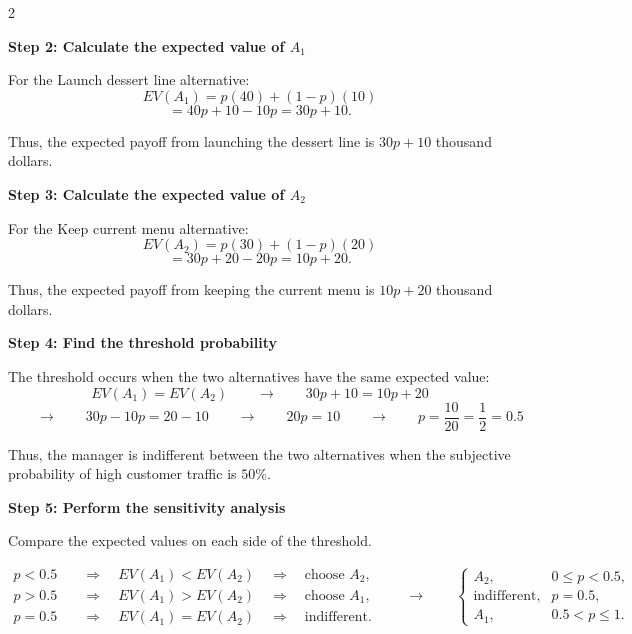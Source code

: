 	\vspace{-3mm}
	
	\noindent
	\setlength{\columnseprule}{0.4pt} 
	\begin{multicols}{2}
		\vspace{0pt}
		
		\textbf{Step 2: Calculate the expected value of $A_1$}
		
		For the Launch dessert line alternative:
		\[
		EV(A_1)
		=
		p(40)
		+
		(1-p)(10)
		\]
		\[
		=
		40p+10-10p
		=
		30p+10.
		\]
		
		Thus, the expected payoff from launching the dessert line is
		$30p+10$ thousand dollars.
		
		\columnbreak
		
		\textbf{Step 3: Calculate the expected value of $A_2$}
		
		For the Keep current menu alternative:
		\[
		EV(A_2)
		=
		p(30)
		+
		(1-p)(20)
		\]
		\[
		=
		30p+20-20p
		=
		10p+20.
		\]
		
		Thus, the expected payoff from keeping the current menu is
		$10p+20$ thousand dollars.
		
	\end{multicols}
	
	
	\setlength{\columnseprule}{0pt}
	
	\textbf{Step 4: Find the threshold probability}
	
	The threshold occurs when the two alternatives have the same expected
	value:
	\[
	EV(A_1)=EV(A_2)
	\qquad \longrightarrow \qquad
	30p+10=10p+20
	\]
	\[
	\qquad \longrightarrow \qquad
	30p-10p=20-10
	\qquad \longrightarrow \qquad
	20p=10
	\qquad \longrightarrow \qquad
	p=\frac{10}{20}
	=\frac{1}{2}
	=0.5
	\]
	
	Thus, the manager is indifferent between the two alternatives when the
	subjective probability of high customer traffic is $50\%$.
	
	\textbf{Step 5: Perform the sensitivity analysis}
	
	Compare the expected values on each side of the threshold.
	
	\[
	\begin{aligned}
		p<0.5 &\quad\Rightarrow\quad EV(A_1)<EV(A_2) \quad\Rightarrow\quad \text{choose } A_2,\\
		p>0.5 &\quad\Rightarrow\quad EV(A_1)>EV(A_2) \quad\Rightarrow\quad \text{choose } A_1,\\
		p=0.5 &\quad\Rightarrow\quad EV(A_1)=EV(A_2) \quad\Rightarrow\quad \text{indifferent}.
	\end{aligned}
	\qquad \longrightarrow \qquad
	\boxed{
		\begin{cases}
			A_2, & 0\leq p<0.5,\\
			\text{indifferent}, & p=0.5,\\
			A_1, & 0.5<p\leq1.
	\end{cases}}
	\]
	
